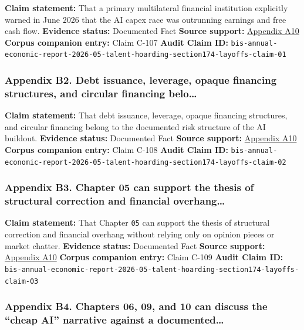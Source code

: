\documentclass[
  american,
  11pt,
  letterpaper,
]{article}
\begin{document}
\textbf{Claim statement:} That a primary multilateral financial
institution explicitly warned in June 2026 that the AI capex race was
outrunning earnings and free cash flow. \textbf{Evidence status:}
Documented Fact \textbf{Source support:}
\hyperref[ch-09-appendix-a10-annual-economic-report-2026]{Appendix A10}
\textbf{Corpus companion entry:} Claim C-107 \textbf{Audit Claim ID:}
\texttt{bis-annual-economic-report-2026-05-talent-hoarding-section174-layoffs-claim-01}

\subsubsection{Appendix B2. Debt issuance, leverage, opaque financing
structures, and circular financing
belo\ldots{}}\label{ch-09-appendix-b2-debt-issuance-leverage-opaque-financing-structures-and-circular-financing-belo}

\textbf{Claim statement:} That debt issuance, leverage, opaque financing
structures, and circular financing belong to the documented risk
structure of the AI buildout. \textbf{Evidence status:} Documented Fact
\textbf{Source support:}
\hyperref[ch-09-appendix-a10-annual-economic-report-2026]{Appendix A10}
\textbf{Corpus companion entry:} Claim C-108 \textbf{Audit Claim ID:}
\texttt{bis-annual-economic-report-2026-05-talent-hoarding-section174-layoffs-claim-02}

\subsubsection{Appendix B3. Chapter 05 can support the thesis of
structural correction and financial
overhang\ldots{}}\label{ch-09-appendix-b3-chapter-05-can-support-the-thesis-of-structural-correction-and-financial-overhang}

\textbf{Claim statement:} That Chapter \texttt{05} can support the
thesis of structural correction and financial overhang without relying
only on opinion pieces or market chatter. \textbf{Evidence status:}
Documented Fact \textbf{Source support:}
\hyperref[ch-09-appendix-a10-annual-economic-report-2026]{Appendix A10}
\textbf{Corpus companion entry:} Claim C-109 \textbf{Audit Claim ID:}
\texttt{bis-annual-economic-report-2026-05-talent-hoarding-section174-layoffs-claim-03}

\subsubsection{Appendix B4. Chapters 06, 09, and 10 can discuss the
``cheap AI'' narrative against a
documented\ldots{}}\label{ch-09-appendix-b4-chapters-06-09-and-10-can-discuss-the-cheap-ai-narrative-against-a-documented}
\end{document}
